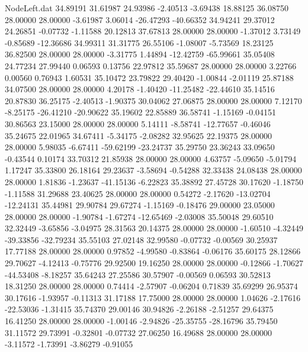 \begin{filecontents}{NodeLeft.dat}
  34.89191   31.61987   24.93986    -2.40513   -3.69438   18.88125   36.08750   28.00000   28.00000   -3.61987    3.06014  -26.47293  -40.66352
  34.94241   29.37012   24.26851    -0.07732   -1.11588   20.12813   37.67813   28.00000   28.00000   -1.37012    3.73149   -0.85689  -12.36686
  34.99311   31.31775   26.55106    -1.08007   -5.73569   18.23125   36.82500   28.00000   28.00000   -3.31775    1.44894  -12.42759  -65.99661
  35.05408   24.77234   27.99440     0.06593    0.13756   22.97812   35.59687   28.00000   28.00000    3.22766    0.00560    0.76943    1.60531
  35.10472   23.79822   29.40420    -1.00844   -2.01119   25.87188   34.07500   28.00000   28.00000    4.20178   -1.40420  -11.25482  -22.44610
  35.14516   20.87830   36.25175    -2.40513   -1.90375   30.04062   27.06875   28.00000   28.00000    7.12170   -8.25175  -26.41210  -20.90622
  35.19602   22.85889   36.58741    -1.15169   -0.04151   30.86563   23.15000   28.00000   28.00000    5.14111   -8.58741  -12.77657   -0.46046
  35.24675   22.01965   34.67411    -5.34175   -2.08282   32.95625   22.19375   28.00000   28.00000    5.98035   -6.67411  -59.62199  -23.24737
  35.29750   23.36243   33.09650    -0.43544    0.10174   33.70312   21.85938   28.00000   28.00000    4.63757   -5.09650   -5.01794    1.17247
  35.33800   26.18164   29.23637    -3.58694   -0.54288   32.33438   24.08438   28.00000   28.00000    1.81836   -1.23637  -41.15136   -6.22823
  35.38892   27.45728   30.17620    -1.18750   -1.11588   31.29688   23.40625   28.00000   28.00000    0.54272   -2.17620  -13.02704  -12.24131
  35.44981   29.90784   29.67274    -1.15169   -0.18476   29.00000   23.05000   28.00000   28.00000   -1.90784   -1.67274  -12.65469   -2.03008
  35.50048   29.60510   32.32449    -3.65856   -3.04975   28.31563   20.14375   28.00000   28.00000   -1.60510   -4.32449  -39.33856  -32.79234
  35.55103   27.02148   32.99580    -0.07732   -0.00569   30.25937   17.77188   28.00000   28.00000    0.97852   -4.99580   -0.83864   -0.06176
  35.60175   28.12866   29.70627    -4.12413   -0.75776   29.92500   19.16250   28.00000   28.00000   -0.12866   -1.70627  -44.53408   -8.18257
  35.64243   27.25586   30.57907    -0.00569    0.06593   30.52813   18.31250   28.00000   28.00000    0.74414   -2.57907   -0.06204    0.71839
  35.69299   26.95374   30.17616    -1.93957   -0.11313   31.17188   17.75000   28.00000   28.00000    1.04626   -2.17616  -22.53036   -1.31415
  35.74370   29.00146   30.94826    -2.26188   -2.51257   29.64375   16.41250   28.00000   28.00000   -1.00146   -2.94826  -25.35755  -28.16796
  35.79450   31.11572   29.73991    -0.32801   -0.07732   27.06250   16.49688   28.00000   28.00000   -3.11572   -1.73991   -3.86279   -0.91055

\end{filecontents}
